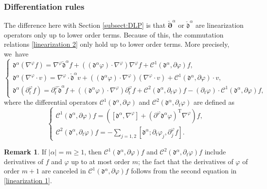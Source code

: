 \documentclass[11pt]{article}
\newcommand{\dt}{\partial_t}
\newcommand{\cpalpha}{\check{\bm{\partial}}^{\alpha} }
\newcommand{\cmfalpha}{\check{\mathfrak{d}}^{\alpha}}
\theoremstyle{definition}
\newtheorem{remark}[theorem]{Remark}
\begin{document}
\subsubsection{Differentiation rules} \label{sectdiffrules}
The difference here with Section \ref{subsect:DLP} is that $\cpalpha$ or $\cmfalpha$ are linearization operators only up to lower order terms.
Because of this, the commutation relations \eqref{linearization 2} only hold up to lower order terms. More precisely, we~have
\begin{equation}\label{comrules2}
\begin{cases}
\mathfrak{d}^\alpha(\nabla^\varphi f)
= \nabla^\varphi \cmfalpha f \!+\! ((\mathfrak{d}^\alpha\varphi)\cdot\nabla^\varphi)\nabla^\varphi f \!+\!{\mathcal C}^1(\mathfrak{d}^\alpha,\partial \varphi) f, \\
\mathfrak{d}^\alpha(\nabla^\varphi\cdot v)
= \nabla^\varphi\cdot \cmfalpha v
\!+\! ((\mathfrak{d}^\alpha\varphi)\cdot\nabla^\varphi)(\nabla^\varphi\cdot v) \!+\!{\mathcal C}^1(\mathfrak{d}^\alpha,\partial \varphi)\cdot v, \\
\mathfrak{d}^\alpha(\dt^\varphi f)
= \dt^\varphi \cmfalpha f\!+\! ((\mathfrak{d}^\alpha\varphi)\cdot\nabla^\varphi)\dt^\varphi f \!+\!
{\mathcal C}^2(\mathfrak{d}^\alpha,\dt \varphi) f
- (\dt\varphi)\cdot {\mathcal C}^1(\mathfrak{d}^\alpha,\partial \varphi)f,
\end{cases}
\end{equation}
where the differential operators ${\mathcal C}^1(\mathfrak{d}^\alpha,\partial \varphi)$ and ${\mathcal C}^2(\mathfrak{d}^\alpha,\dt \varphi)$ are defined as
\begin{equation}\label{defcomC}
\begin{cases}
{\mathcal C}^1(\mathfrak{d}^\alpha,\partial \varphi) f
= ([\mathfrak{d}^\alpha,\nabla^\varphi]+(\partial^\varphi\mathfrak{d}^\alpha\varphi)^\mathrm{T}\nabla^\varphi)f, \\
{\mathcal C}^2(\mathfrak{d}^\alpha,\dt \varphi) f
= - \textstyle\sum_{j=1,2}[\mathfrak{d}^\alpha; \dt\varphi_j,\partial_j^\varphi f].
\end{cases}
\end{equation}

\begin{remark}\label{remC1C2}
If $|\alpha|=m\geq1$, then ${\mathcal C}^1(\mathfrak{d}^\alpha,\partial \varphi) f$
and ${\mathcal C}^2(\mathfrak{d}^\alpha,\dt \varphi) f$ include derivatives of $f$ and $\varphi$ up to at most order $m$;
the fact that the derivatives of $\varphi$ of order $m+1$ are canceled in ${\mathcal C}^1(\mathfrak{d}^\alpha,\partial \varphi) f$
follows from the second equation in \eqref{linearization 1}.
\end{remark}
\end{document}
